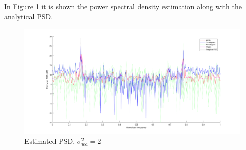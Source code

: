 \documentclass[a4paper, 12pt]{report}
\begin{document}
In Figure \ref{fig:estimatedpsd2} it is shown the power spectral density estimation along with the analytical PSD.

\begin{figure}[H]
	\centering
	\includegraphics[width=1\textwidth]{estimatedpsd2}
	\caption{Estimated PSD, $\sigma_{wa}^2 = 2$}
	\label{fig:estimatedpsd2}
\end{figure}
\newpage
\end{document}
